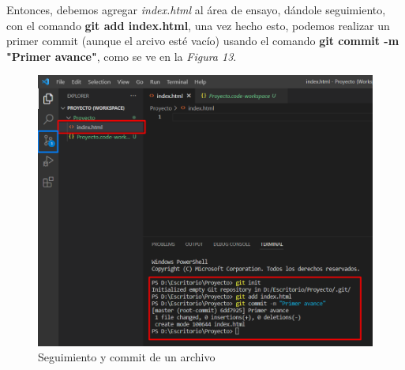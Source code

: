 Entonces, debemos agregar \textit{index.html} al área de ensayo, dándole seguimiento, con el comando \textbf{git add index.html}, una vez hecho esto, podemos realizar un primer commit (aunque el arcivo esté vacío) usando el comando \textbf{git commit -m "Primer avance"}, como se ve en la \textit{Figura 13}.
\begin{figure}[H]
    \begin{center}
        \caption{Seguimiento y commit de un archivo}
        \label{fig: 13}
        \includegraphics[width=12cm]{capturas/git add git commit.png}
    \end{center}
\end{figure}

